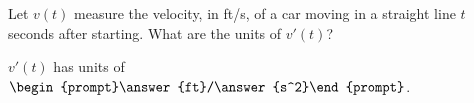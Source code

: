 \documentclass{ximera}
\author{Gregory Hartman \and Matthew Carr}
\begin{document}
\begin{exercise}





Let $v(t)$ measure the velocity, in ft/s, of a car moving in a straight line $t$ seconds after starting. What are the units of $v'(t)$?

\begin{center}
$v'(t)$ has units of $\begin{prompt}\answer{ft}/\answer{s^2}\end{prompt}$.
\end{center}

\end{exercise}
\end{document}
